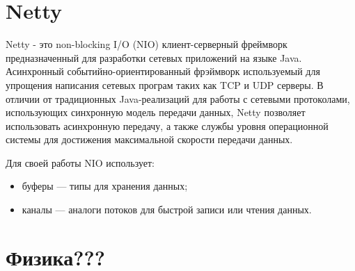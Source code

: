 \section{Netty}
Netty - это  non-blocking I/O (NIO)  клиент-серверный фреймворк предназначенный для разработки сетевых приложений на языке Java. Асинхронный событийно-ориентированный фрэймворк используемый для упрощения написания сетевых програм таких как TCP и UDP серверы. В отличии от традиционных Java-реализаций для работы с сетевыми протоколами, использующих синхронную модель передачи данных, Netty позволяет использовать асинхронную передачу, а также службы уровня операционной системы для достижения максимальной скорости передачи данных.

Для своей работы NIO использует:
\begin{itemize}
\item буферы — типы для хранения данных;
\item каналы — аналоги потоков для быстрой записи или чтения данных.
\end{itemize}


\section{Физика???}